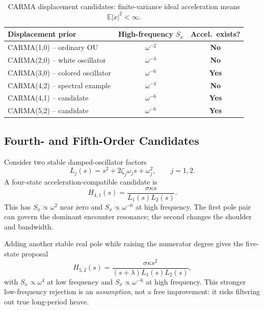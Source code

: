 \documentclass[10pt,journal]{IEEEtran}
\newcommand{\E}{\mathbb E}
\newcommand{\PSD}{S_x}
\begin{document}
\begin{table}[t]
\centering
\caption{CARMA displacement candidates: finite-variance ideal
acceleration means \(\E|\ddot x|^2<\infty\).}
\label{tab:regularity}
\footnotesize
\setlength{\tabcolsep}{5pt}
\begin{tabular}{@{}lcc@{}}
\toprule
Displacement prior & High-frequency \(\PSD\) & Accel.\ exists?\\
\midrule
CARMA(1,0) -- ordinary OU & \(\omega^{-2}\) & \textbf{No}\\
CARMA(2,0) -- white oscillator & \(\omega^{-4}\) & \textbf{No}\\
CARMA(3,0) -- colored oscillator & \(\omega^{-6}\) & \textbf{Yes}\\
CARMA(4,2) -- spectral example & \(\omega^{-4}\) & \textbf{No}\\
CARMA(4,1) -- candidate & \(\omega^{-6}\) & \textbf{Yes}\\
CARMA(5,2) -- candidate & \(\omega^{-6}\) & \textbf{Yes}\\
\bottomrule
\end{tabular}
\end{table}

\subsection{Fourth- and Fifth-Order Candidates}
Consider two stable damped-oscillator factors
\begin{equation}
L_j(s)=s^2+2\zeta_j\omega_js+\omega_j^2,\qquad j=1,2.
\end{equation}
A four-state acceleration-compatible candidate is
\begin{equation}
H_{4,1}(s)=\frac{\sigma\kappa s}{L_1(s)L_2(s)}.
\label{eq:41}
\end{equation}
This has \(\PSD\propto\omega^2\) near zero and
\(\PSD\propto\omega^{-6}\) at high frequency. The first
pole pair can govern the dominant encounter resonance; the second
changes the shoulder and bandwidth.

Adding another stable real pole while raising the numerator degree
gives the five-state proposal
\begin{equation}
H_{5,2}(s)=
\frac{\sigma\kappa s^2}{(s+\lambda)L_1(s)L_2(s)},
\label{eq:52}
\end{equation}
with \(\PSD\propto\omega^4\) at low frequency and
\(\PSD\propto\omega^{-6}\) at high frequency.
This stronger low-frequency rejection is an \emph{assumption},
not a free improvement: it risks filtering out true long-period
heave.
\end{document}
